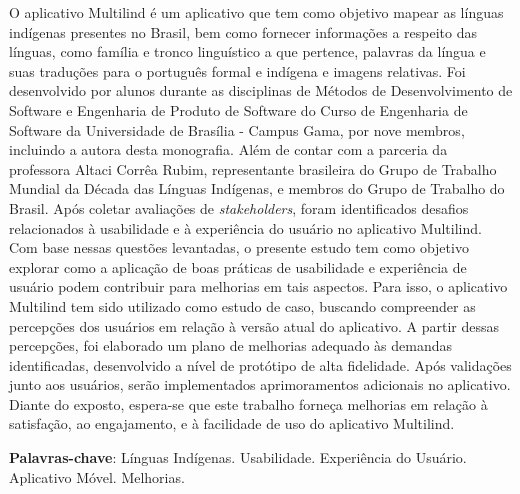 \begin{resumo}
    O aplicativo Multilind é um aplicativo que tem como objetivo mapear as línguas indígenas presentes no Brasil, bem como fornecer informações a respeito das línguas, como família e tronco linguístico a que pertence, palavras 
    da língua e suas traduções para o português formal e indígena e imagens relativas. Foi desenvolvido por alunos durante as disciplinas de Métodos de Desenvolvimento de Software e Engenharia de Produto de Software do
    Curso de Engenharia de Software da Universidade de Brasília - Campus Gama, por nove membros, incluindo a autora desta monografia. Além de contar com a parceria 
    da professora Altaci Corrêa Rubim, representante brasileira do Grupo de Trabalho Mundial da Década das Línguas Indígenas, e membros do Grupo de Trabalho do Brasil. Após coletar avaliações de \textit{stakeholders}, foram identificados 
    desafios relacionados à usabilidade e à experiência do usuário no aplicativo Multilind. Com base nessas questões levantadas, o presente estudo tem como objetivo explorar como a aplicação de boas práticas de usabilidade e experiência 
    de usuário podem contribuir para melhorias em tais aspectos. Para isso, o aplicativo Multilind tem sido utilizado como estudo de caso, buscando compreender as percepções dos usuários em relação à versão atual do aplicativo. A partir dessas 
    percepções, foi elaborado um plano de melhorias adequado às demandas identificadas, desenvolvido a nível de protótipo de alta fidelidade. Após validações junto aos usuários, serão 
    implementados aprimoramentos adicionais no aplicativo. Diante do exposto, espera-se que este trabalho forneça melhorias em relação à satisfação, ao engajamento, e à facilidade de uso do aplicativo Multilind.
    
 \vspace{\onelineskip}
    
 \noindent
 \textbf{Palavras-chave}: Línguas Indígenas. Usabilidade. Experiência do Usuário. Aplicativo Móvel. Melhorias.
\end{resumo}
